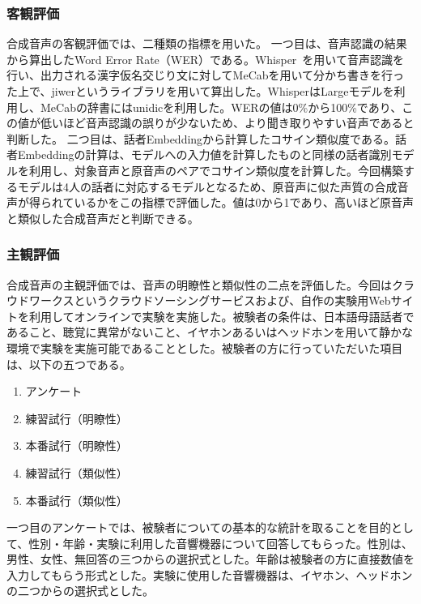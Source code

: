 \documentclass[12pt]{jarticle}
\numberwithin{equation}{section}    %
\numberwithin{figure}{section}      %
\numberwithin{table}{section}      %
\begin{document}
\subsubsection{客観評価}
合成音声の客観評価では、二種類の指標を用いた。
一つ目は、音声認識の結果から算出したWord Error Rate（WER）である。Whisper~\cite{radford2023robust}を用いて音声認識を行い、出力される漢字仮名交じり文に対してMeCabを用いて分かち書きを行った上で、jiwerというライブラリを用いて算出した。WhisperはLargeモデルを利用し、MeCabの辞書にはunidicを利用した。WERの値は0\%から100\%であり、この値が低いほど音声認識の誤りが少ないため、より聞き取りやすい音声であると判断した。
二つ目は、話者Embeddingから計算したコサイン類似度である。話者Embeddingの計算は、モデルへの入力値を計算したものと同様の話者識別モデルを利用し、対象音声と原音声のペアでコサイン類似度を計算した。今回構築するモデルは4人の話者に対応するモデルとなるため、原音声に似た声質の合成音声が得られているかをこの指標で評価した。値は0から1であり、高いほど原音声と類似した合成音声だと判断できる。

\subsubsection{主観評価}
合成音声の主観評価では、音声の明瞭性と類似性の二点を評価した。今回はクラウドワークスというクラウドソーシングサービスおよび、自作の実験用Webサイトを利用してオンラインで実験を実施した。被験者の条件は、日本語母語話者であること、聴覚に異常がないこと、イヤホンあるいはヘッドホンを用いて静かな環境で実験を実施可能であることとした。被験者の方に行っていただいた項目は、以下の五つである。
\begin{enumerate}
    \item アンケート
    \item 練習試行（明瞭性）
    \item 本番試行（明瞭性）
    \item 練習試行（類似性）
    \item 本番試行（類似性）
\end{enumerate}

一つ目のアンケートでは、被験者についての基本的な統計を取ることを目的として、性別・年齢・実験に利用した音響機器について回答してもらった。性別は、男性、女性、無回答の三つからの選択式とした。年齢は被験者の方に直接数値を入力してもらう形式とした。実験に使用した音響機器は、イヤホン、ヘッドホンの二つからの選択式とした。
\end{document}
